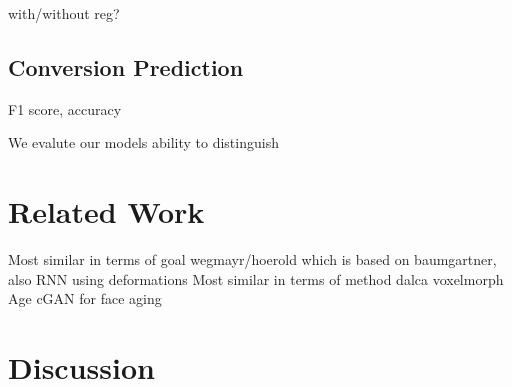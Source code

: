 

with/without reg?

\section{Conversion Prediction}
F1 score, accuracy

We evalute our models ability to distinguish 

\chapter{Related Work}
Most similar in terms of goal wegmayr/hoerold which is based on baumgartner, also RNN using deformations
Most similar in terms of method dalca voxelmorph
Age cGAN for face aging

\chapter{Discussion}
